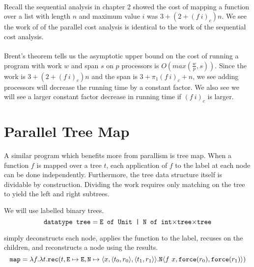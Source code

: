 \paragraph{}
Recall the sequential  analysis in chapter 2 showed the cost of
mapping a function  over a list  with length $n$ and maximum value
$i$ was $3 + (2 + (f\ i)_c)n$. We see the work of of the parallel cost analysis
is identical to the work of the sequential cost analysis.

\paragraph{}
Brent's theorem tells us the asymptotic upper bound on the cost of running a
program with work $w$ and span $s$ on $p$ processors is $O(max(\frac{w}{p},
s))$. Since the work is $3 + (2 + (f\ i)_c)n$ and the span is $3 + \pi_1(f\
i)_c + n$, we see adding processors will decrease the running time by a
constant factor. We also see we will see a larger constant factor decrease in
running time if $(f\ i)_c$ is larger.


\section{Parallel Tree Map}

\paragraph{}
A similar program which benefits more from parallism is tree map.  When a
function $f$ is mapped over a tree $t$, each application of $f$ to the label at
each node can be done independently.  Furthermore, the tree data structure
itself is dividable by construction.  Dividing the work requires only
matching on the tree to yield the left and right subtrees.

We will use  labelled binary trees.
%
\begin{equation*}
  \texttt{datatype tree} = \texttt{E of Unit | N of int$\times$tree$\times$tree}
\end{equation*}

%
 simply deconstructs each node, applies the function to the label,
recuses on the children, and reconstructs a node using the results.
%
\begin{equation*}
  \texttt{map} = \lambda f.\lambda t.\texttt{rec}(t, \texttt{E} \mapsto \texttt{E}, \texttt{N} \mapsto \langle x, \langle t_0, r_0 \rangle, \langle t_1, r_1 \rangle\rangle.\texttt{N} \langle f\ x, \texttt{force}(r_0), \texttt{force}(r_1)\rangle)
\end{equation*}
%
